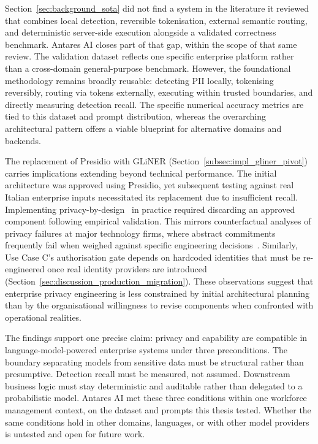 Section~\ref{sec:background_sota} did not find a system in the literature it reviewed that combines local detection, reversible tokenisation, external semantic routing, and deterministic server-side execution alongside a validated correctness benchmark. Antares AI closes part of that gap, within the scope of that same review. The validation dataset reflects one specific enterprise platform rather than a cross-domain general-purpose benchmark. However, the foundational methodology remains broadly reusable: detecting PII locally, tokenising reversibly, routing via tokens externally, executing within trusted boundaries, and directly measuring detection recall. The specific numerical accuracy metrics are tied to this dataset and prompt distribution, whereas the overarching architectural pattern offers a viable blueprint for alternative domains and backends.

The replacement of Presidio with GLiNER (Section~\ref{subsec:impl_gliner_pivot}) carries implications extending beyond technical performance. The initial architecture was approved using Presidio, yet subsequent testing against real Italian enterprise inputs necessitated its replacement due to insufficient recall. Implementing privacy-by-design~\cite{cavoukian2009privacy} in practice required discarding an approved component following empirical validation. This mirrors counterfactual analyses of privacy failures at major technology firms, where abstract commitments frequently fail when weighed against specific engineering decisions~\cite{rubinstein2013counterfactual}. Similarly, Use Case C's authorisation gate depends on hardcoded identities that must be re-engineered once real identity providers are introduced (Section~\ref{sec:discussion_production_migration}). These observations suggest that enterprise privacy engineering is less constrained by initial architectural planning than by the organisational willingness to revise components when confronted with operational realities.

The findings support one precise claim: privacy and capability are compatible in language-model-powered enterprise systems under three preconditions. The boundary separating models from sensitive data must be structural rather than presumptive. Detection recall must be measured, not assumed. Downstream business logic must stay deterministic and auditable rather than delegated to a probabilistic model. Antares AI met these three conditions within one workforce management context, on the dataset and prompts this thesis tested. Whether the same conditions hold in other domains, languages, or with other model providers is untested and open for future work.